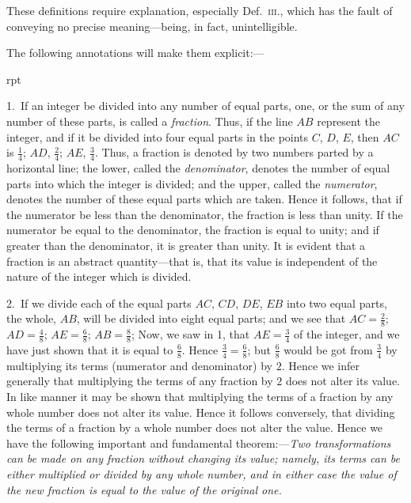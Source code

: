 \documentclass[oneside]{book}
\newcommand\imgflow[3]{
\setcounter{wrapwidth}{#1}
\begin{wrapfigure}[#2]{r}{\value{wrapwidth}pt}
\begin{center}
\vspace{-0.3in}
\end{center}
\end{wrapfigure}
}
\begin{document}
These definitions require explanation, especially
Def.~\textsc{iii.}, which has the fault of conveying no precise
meaning---being, in fact, unintelligible.

The following annotations will make them explicit:---\par\smallskip

\imgflow{153}{2}{f256}

\begin{footnotesize}
1.~If an integer be divided into any number of equal parts,
one, or the sum of any number of these parts, is called a \emph{fraction}.
Thus, if the line $AB$ represent
the integer, and if it be divided
into four equal parts in the
points $C$, $D$, $E$, then $AC$ is $\frac{1}{4}$;
$AD$, $\frac{2}{4}$; $AE$, $\frac{3}{4}$. Thus, a fraction is denoted by two numbers
parted by a horizontal line; the lower, called the \emph{denominator},
denotes the number of equal parts into which the integer is divided;
and the upper, called the \emph{numerator}, denotes the number
of these equal parts which are taken. Hence it follows, that if
the numerator be less than the denominator, the fraction is less
than unity. If the numerator be equal to the denominator, the
fraction is equal to unity; and if greater than the denominator, it
is greater than unity. It is evident that a fraction is an abstract
quantity---that is, that its value is independent of the nature of
the integer which is divided.

2.~If we divide each of the equal parts $AC$, $CD$, $DE$, $EB$ into
two equal parts, the whole, $AB$, will be divided into eight equal
parts; and we see that $AC = \frac{2}{8}$; $AD = \frac{4}{8}$; $AE = \frac{6}{8}$; $AB = \frac{8}{8}$;
Now, we saw in 1, that $AE = \frac{3}{4}$ of the integer, and we have just
shown that it is equal to $\frac{6}{8}$. Hence $\frac{3}{4}=\frac{6}{8}$; but $\frac{6}{8}$ would be got
from $\frac{3}{4}$ by multiplying its terms (numerator and denominator)
by $2$. Hence we infer generally that multiplying the terms of
any fraction by $2$ does not alter its value. In like manner it
may be shown that multiplying the terms of a fraction by any
whole number does not alter its value. Hence it follows conversely,
that dividing the terms of a fraction by a whole number
does not alter the value. Hence we have the following important
and fundamental theorem:---\textit{Two transformations can be made on
any fraction without changing its value; namely, its terms can be
either multiplied or divided by any whole number, and in either
case the value of the new fraction is equal to the value of the
original one.}



\end{footnotesize}
\end{document}
